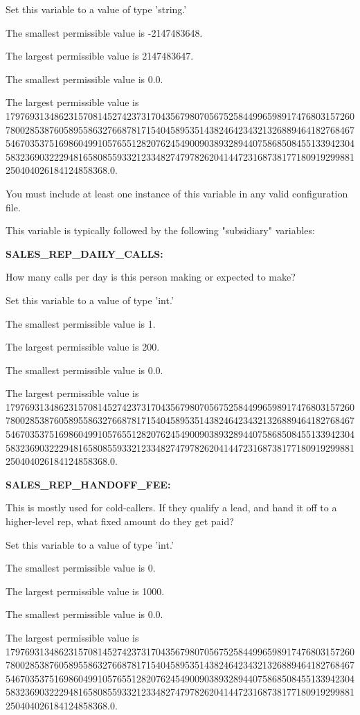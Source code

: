 Set this variable to a value of type 'string.'

The smallest permissible value is -2147483648.

The largest permissible value is 2147483647.

The smallest permissible value is 0.0.

The largest permissible value is 179769313486231570814527423731704356798070567525844996598917476803157260780028538760589558632766878171540458953514382464234321326889464182768467546703537516986049910576551282076245490090389328944075868508455133942304583236903222948165808559332123348274797826204144723168738177180919299881250404026184124858368.0.

You must include at least one instance of this variable in any valid configuration file.

This variable is typically followed by the following "subsidiary" variables:


\textbf{SALES\_REP\_DAILY\_CALLS:}


How many calls per day is this person making or expected to make?

Set this variable to a value of type 'int.'

The smallest permissible value is 1.

The largest permissible value is 200.

The smallest permissible value is 0.0.

The largest permissible value is 179769313486231570814527423731704356798070567525844996598917476803157260780028538760589558632766878171540458953514382464234321326889464182768467546703537516986049910576551282076245490090389328944075868508455133942304583236903222948165808559332123348274797826204144723168738177180919299881250404026184124858368.0.


\textbf{SALES\_REP\_HANDOFF\_FEE:}


This is mostly used for cold-callers.  If they qualify a lead, and hand it off to a higher-level rep, what fixed amount do they get paid?

Set this variable to a value of type 'int.'

The smallest permissible value is 0.

The largest permissible value is 1000.

The smallest permissible value is 0.0.

The largest permissible value is 179769313486231570814527423731704356798070567525844996598917476803157260780028538760589558632766878171540458953514382464234321326889464182768467546703537516986049910576551282076245490090389328944075868508455133942304583236903222948165808559332123348274797826204144723168738177180919299881250404026184124858368.0.


